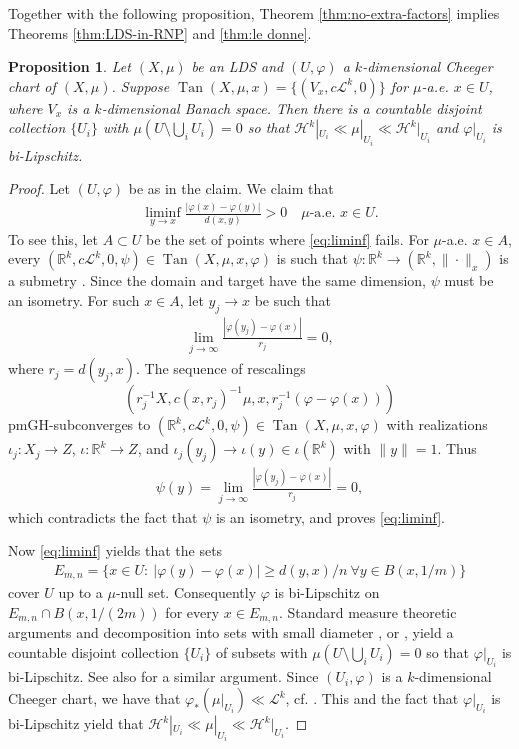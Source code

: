 \documentclass{amsart}
\newtheorem{proposition}[theorem]{Proposition}
\numberwithin{equation}{section}
\newcommand{\R}{\mathbb{R}}
\newcommand{\Ha}{\mathcal{H}}
\newcommand{\leb}{\mathcal{L}}
\newcommand{\inv}{^{-1}}
\newcommand{\Tan}{\operatorname{Tan}}
\begin{document}
Together with the following proposition, Theorem \ref{thm:no-extra-factors} implies Theorems \ref{thm:LDS-in-RNP} and \ref{thm:le donne}.
\begin{proposition}\label{prop:bilip-decomp}
    Let $(X,\mu)$ be an LDS and $(U,\varphi)$ a $k$-dimensional Cheeger chart of $(X,\mu)$. Suppose $\Tan(X,\mu,x)=\{(V_x,c\leb^k,0)\}$ for $\mu$-a.e. $x\in U$, where $V_x$ is a $k$-dimensional Banach space. Then there is a countable disjoint collection $\{U_i\}$ with $\mu(U\setminus\bigcup_iU_i)=0$ so that $\Ha^k|_{U_i}\ll \mu|_{U_i}\ll \Ha^k|_{U_i}$ and $\varphi|_{U_i}$ is bi-Lipschitz.
\end{proposition}


\begin{proof}
Let $(U,\varphi)$ be as in the claim. We claim that 
\begin{align}\label{eq:liminf}
    \liminf_{y\to x}\frac{|\varphi(x)-\varphi(y)|}{d(x,y)}>0\quad\mu\textrm{-a.e. }x\in U.
\end{align}
To see this, let $A\subset U$ be the set of points where \eqref{eq:liminf} fails. For $\mu$-a.e. $x\in A$, every $(\R^k,c\leb^k,0,\psi)\in \Tan(X,\mu,x,\varphi)$ is such that $\psi:\R^k\to (\R^k,\|\cdot\|_x)$ is a submetry \cite[Corollary 7.99]{che-kle-sch16}. Since the domain and target have the same dimension, $\psi$ must be an isometry. For such $x\in A$, let $y_j\to x$ be such that
\begin{align*}
\lim_{j\to\infty}\frac{|\varphi(y_j)-\varphi(x)|}{r_j}=0,
\end{align*}
where $r_j=d(y_j,x)$. The sequence of rescalings $$(r_j\inv X,c(x,r_j)\inv\mu,x,r_j\inv(\varphi-\varphi(x)))$$ pmGH-subconverges to $(\R^k,c\leb^k,0,\psi)\in \Tan(X,\mu,x,\varphi)$ with realizations $\iota_j:X_j\to Z$, $\iota:\R^k\to Z$, and $\iota_j(y_j)\to \iota(y)\in \iota(\R^k)$ with $\|y\|=1$. Thus 
\begin{align*}
    \psi(y)=\lim_{j\to\infty}\frac{|\varphi(y_j)-\varphi(x)|}{r_j}=0,
\end{align*}
which contradicts the fact that $\psi$ is an isometry, and proves \eqref{eq:liminf}.

Now \eqref{eq:liminf} yields that the sets 
\begin{align*}
E_{m,n}=\{x\in U:\ |\varphi(y)-\varphi(x)|\ge d(y,x)/n\ \forall y\in B(x,1/m)\}
\end{align*}
cover $U$ up to a $\mu$-null set. Consequently $\varphi$ is bi-Lipschitz on $E_{m,n}\cap B(x,1/(2m))$ for every $x\in E_{m,n}$. Standard measure theoretic arguments and decomposition into sets with small diameter \cite[Proposition 3.1.1]{kei04'}, or \cite[Lemma 15.13]{mat95},  yield a countable disjoint collection $\{U_i\}$ of subsets with $\mu(U\setminus \bigcup_iU_i)=0$ so that $\varphi|_{U_i}$ is bi-Lipschitz. See also \cite[Corollary 3.2]{lytopen} for a similar argument. Since $(U_i,\varphi)$ is a $k$-dimensional Cheeger chart, we have that $\varphi_\ast(\mu|_{U_i})\ll \leb^k$, cf. \cite[Theorem 1.1]{de2017conjecture}. This and the fact that $\varphi|_{U_i}$ is bi-Lipschitz yield that $\Ha^k|_{U_i}\ll\mu|_{U_i}\ll \Ha^k|_{U_i}$. 
\end{proof}
\end{document}
